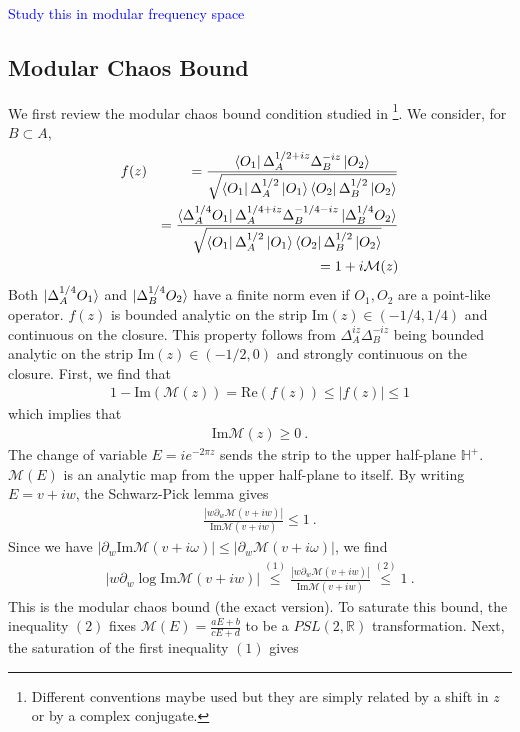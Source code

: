 \documentclass[a4paper,11pt]{article}
\theoremstyle{definition}
\newcommand{\nn}{\nonumber}
\newcommand{\mM}{\mathcal{M}}
\newcommand{\NL}[1]{\textcolor{blue}{#1}}
\newcommand{\p}{\partial}
\begin{document}
\NL{Study this in modular frequency space}

\subsection{Modular Chaos Bound}
We first review the modular chaos bound condition studied in \cite{}\footnote{Different conventions maybe used but they are simply related by a shift in $z$ or by a complex conjugate.}. We consider, for $B \subset A$,
\begin{eqnarray}
    f(z)&&=\frac{\bra{O_1}\Delta_A^{1/2+iz}\Delta_B^{-iz}\ket{O_2}}{\sqrt{\bra{O_1}\Delta_A^{1/2}\ket{O_1} \bra{O_2}\Delta_B^{1/2}\ket{O_2}}}\\
    &&=\frac{\bra{\Delta_A^{1/4}O_1} \Delta_A^{1/4+iz}\Delta_B^{-1/4-iz}\ket{\Delta_B^{1/4} O_2}}{\sqrt{\bra{O_1}\Delta_A^{1/2}\ket{O_1} \bra{O_2}\Delta_B^{1/2}\ket{O_2}}}\nn\\
    &&=1+i \mathcal{M}(z)
\end{eqnarray}
Both $\ket{\Delta_A^{1/4}O_1}$ and $\ket{\Delta_B^{1/4} O_2}$ have a finite norm even if $O_1, O_2$ are a point-like operator. $f(z)$ is bounded analytic on the strip Im$(z) \in (-1/4,1/4)$ and continuous on the closure. This property follows from $\Delta_A^{iz}\Delta_B^{-iz}$ being bounded analytic on the strip Im$(z) \in (-1/2,0)$ and strongly continuous on the closure. 
First, we find that 
\begin{eqnarray}
    1-\text{Im}(\mathcal{M}(z))=\text{Re}(f(z))\leq |f(z)|\leq 1
\end{eqnarray}
which implies that 
\begin{eqnarray}
    \text{Im}\mathcal{M}(z)\geq 0\ .
\end{eqnarray}
The change of variable $E=ie^{-2\pi z}$ sends the strip to the upper half-plane $\mathbb{H}^+$. $\mM(E)$ is an analytic map from the upper half-plane to itself. By writing $E=v+iw$, the Schwarz-Pick lemma gives
\begin{eqnarray}
    \frac{|w \p_w \mM(v+iw)|}{\text{Im} \mM(v+iw)}\leq 1\ . 
\end{eqnarray}
Since we have $|\p_w \text{Im}\mM(v+i\omega)|\leq |\p_w \mM(v+i\omega)|$, we find
\begin{eqnarray}
    |w\p_w \log \text{Im} \mM(v+iw)| \stackrel{(1)}{\leq} \frac{|w \p_w \mM(v+iw)|}{\text{Im} \mM(v+iw)} \stackrel{(2)}{\leq} 1\ .
\end{eqnarray}
This is the modular chaos bound (the exact version). To saturate this bound, the inequality $(2)$ fixes $\mM(E)=\frac{a E+b}{c E+d}$ to be a $PSL(2,\mathbb{R})$ transformation. Next, the saturation of the first inequality $(1)$ gives
\end{document}
